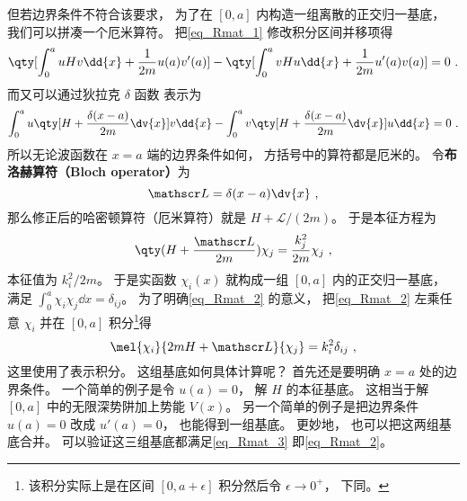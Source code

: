 但若边界条件不符合该要求， 为了在 $[0,a]$ 内构造一组离散的正交归一基底， 我们可以拼凑一个厄米算符。 把\autoref{eq_Rmat_1} 修改积分区间并移项得
\begin{equation}
\qty[\int_{0}^{a} uHv\dd{x} + \frac{1}{2m}u(a)v'(a)] - \qty[\int_{0}^{a} vHu\dd{x} + \frac{1}{2m}u'(a)v(a)]
= 0~.
\end{equation}
而又可以通过狄拉克 $\delta$ 函数 表示为
\begin{equation}
\int_{0}^{a} u\qty[H + \frac{\delta(x-a)}{2m}\dv{x}] v\dd{x} -
\int_{0}^{a} v\qty[H + \frac{\delta(x-a)}{2m}\dv{x}] u\dd{x} = 0~.
\end{equation}
所以无论波函数在 $x=a$ 端的边界条件如何， 方括号中的算符都是厄米的。 令\textbf{布洛赫算符（Bloch operator）}为
\begin{equation}\label{eq_Rmat_6}
\mathscr L = \delta(x-a)\dv{x}~,
\end{equation}
那么修正后的哈密顿算符（厄米算符）就是 $H + \mathscr L/(2m)$。 于是本征方程为
\begin{equation}\label{eq_Rmat_2}
\qty(H + \frac{\mathscr L}{2m})\chi_j = \frac{k_j^2}{2m} \chi_j~,
\end{equation}
本征值为 ${k_i^2}/{2m}$。 于是实函数 $\chi_i(x)$ 就构成一组 $[0, a]$ 内的正交归一基底， 满足 $\int_0^a \chi_i \chi_j \dd{x} = \delta_{ij}$。 为了明确\autoref{eq_Rmat_2} 的意义， 把\autoref{eq_Rmat_2} 左乘任意 $\chi_i$ 并在 $[0,a]$ 积分\footnote{该积分实际上是在区间 $[0,a+\epsilon]$ 积分然后令 $\epsilon\to 0^+$， 下同。}得
\begin{equation}\label{eq_Rmat_3}
\mel{\chi_i}{2mH + \mathscr L}{\chi_j} = k_i^2 \delta_{ij}~,
\end{equation}
这里使用了表示积分。 这组基底如何具体计算呢？ 首先还是要明确 $x=a$ 处的边界条件。 一个简单的例子是令 $u(a) = 0$， 解 $H$ 的本征基底。 这相当于解 $[0,a]$ 中的无限深势阱加上势能 $V(x)$。 另一个简单的例子是把边界条件 $u(a) = 0$ 改成 $u'(a) = 0$， 也能得到一组基底。 更妙地， 也可以把这两组基底合并。 可以验证这三组基底都满足\autoref{eq_Rmat_3} 即\autoref{eq_Rmat_2}。


